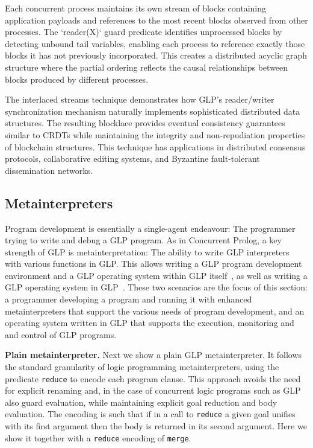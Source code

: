 \documentclass[runningheads,thm-restate]{llncs}
\newcommand{\mypara}[1]{\smallskip\noindent\textbf{#1.}}
\newcommand{\glp}{\textsc{GLP}\xspace}
\begin{document}
Each concurrent process maintains its own stream of blocks containing application payloads and references to the most recent blocks observed from other processes. The `reader(X)` guard predicate identifies unprocessed blocks by detecting unbound tail variables, enabling each process to reference exactly those blocks it has not previously incorporated. This creates a distributed acyclic graph structure where the partial ordering reflects the causal relationships between blocks produced by different processes.

The interlaced streams technique demonstrates how GLP's reader/writer synchronization mechanism naturally implements sophisticated distributed data structures. The resulting blocklace provides eventual consistency guarantees similar to CRDTs while maintaining the integrity and non-repudiation properties of blockchain structures. This technique has applications in distributed consensus protocols, collaborative editing systems, and Byzantine fault-tolerant dissemination networks.


\subsection{Metainterpreters}

Program development is essentially a single-agent endeavour:  The programmer trying to write and debug a GLP program.  As in Concurrent Prolog, a key strength of GLP is metainterpretation:  The ability to write GLP interpreters with various functions in GLP.  This allows writing a GLP program development environment and a GLP operating system within GLP itself~\cite{sterling1994art,safra1988meta,shapiro1982algorithmic,lichtenstein1988concurrent,silverman1988logix}, as well as writing a GLP operating system in GLP~\cite{shapiro1984systems}. These two scenarios are the focus of this section:
a programmer developing a program and running it with enhanced metainterpreters that support the various needs of program development, and an operating system written in GLP that supports the execution, monitoring and and control of GLP programs.

\mypara{Plain metainterpreter}
Next we show a plain \glp metainterpreter.
It follows the standard granularity of logic programming metainterpreters, using the predicate \verb|reduce| to encode each program clause. This approach avoids the need for explicit renaming and, in the case of concurrent logic programs such as GLP also guard evaluation, while maintaining explicit goal reduction and body evaluation. The encoding is such that if in a call to \verb|reduce| a given goal unifies with its first argument then the body is returned in its second argument. Here we show it together with a \verb|reduce| encoding of \verb|merge|.
\end{document}
